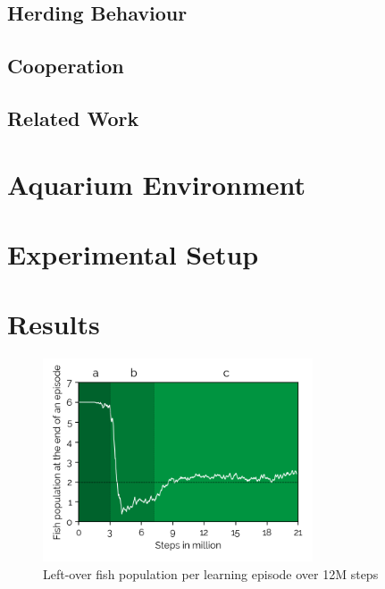 \documentclass[letterpaper]{article}
\begin{document}
\blindtext[2]

\subsection{Herding Behaviour}

\blindtext[2]

\subsection{Cooperation}

\blindtext[2]

\subsection{Related Work}

\blindtext[3]

\section{Aquarium Environment}

\blindtext[4]

\section{Experimental Setup}

\blindtext[2]

\section{Results}

\begin{figure}[t]
\begin{center}
\includegraphics[width=8cm]{figures/fish_pop_chart3.png}
\caption{Left-over fish population per learning episode over 12M steps}
\label{fig:fish_pop}
\end{center}
\end{figure}
\end{document}

